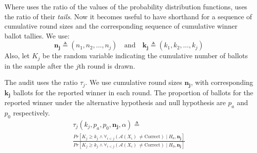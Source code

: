 Where \BRAVO uses the ratio of the values of the probability distribution functions, \Minerva uses the ratio of their \emph{tails}. Now it becomes useful to have shorthand for a sequence of cumulative round sizes and the corresponding sequence
of cumulative winner ballot tallies.
We use:
$$\bm{n_j}\triangleq(n_1,n_2,\ldots,n_j) \quad\text{and}\quad \bm{k_j}\triangleq(k_1,k_2,\ldots,k_j)$$
Also, let $K_j$ be the random variable indicating the cumulative number of ballots in the sample after the $j$th round is drawn.

\begin{definition} \label{def:minerva_ratio} The \R \Minerva audit uses the ratio $\tau_j$. We use cumulative round sizes $\bm{n_j}$, with corresponding $\bm{k_j}$ ballots for the reported winner in each round. The proportion of ballots for the reported winner under the alternative hypothesis and null hypothesis are $p_a$ and $p_0$ respectively.
         \begin{equation}
         \begin{aligned}
             \label{eqn:tau}
                 \tau_{j}(k_{j}, p_a,p_0, \bm{n_j}, \alpha )  \triangleq\\
                 \frac{Pr[K_{j} \geq k_{j} \wedge \forall_{i < j} ({\mathcal{A}}(X_i) ~\neq \text{Correct}) \mid H_a, \bm{n_j}]}{Pr[K_{j} \geq k_{j} \wedge \forall_{i < j} ({\mathcal{A}}(X_i) ~\neq \text{Correct}) \mid H_0, \bm{n_j}]}
         \end{aligned}
         \end{equation}
\end{definition}



\begin{comment}
\begin{definition}[$ (\alpha, p, \bm{n_j} ) $-\Minerva]
     \label{def:minerva}
     Given \B $(\alpha, p)$-\BRAVO and cumulative round sizes\\ $\bm{n_j}$, the corresponding \R \Minerva stopping rule for the $j^{th}$ round is:
 \begin{equation}
     \mathcal{A}(X_{j})=  \left\{ \begin{array}{ll} \text{Correct} ~~~~ \tau_{j}(k_{j}, p_a, \frac{1}{2}, \bm{n_j}, \alpha ) \geq \frac{1}{\alpha}\\
             Undetermined ~~else \\
         \end{array}
         \right .
         \label{eqn:minerva-test}
 \end{equation}
\end{definition}
\end{comment}
